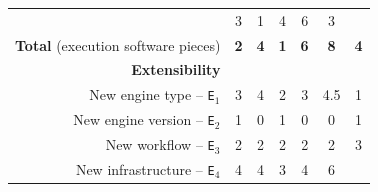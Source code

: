 \documentclass[preprint,3p,twocolumn]{elsarticle}
\begin{document}
\begin{table}
\begin{tabular}{rcccccc}
                                     & \cellcolor[HTML]{99D699}3
                                     & \cellcolor[HTML]{99FF99}1
                                     & \cellcolor[HTML]{99C199}4
                                     & \cellcolor[HTML]{999999}6
                                     & \cellcolor[HTML]{99D699}3\\
  \textbf{Total} (execution software pieces)& \cellcolor[HTML]{99F099}\textbf{2}
                                     & \cellcolor[HTML]{99D399}\textbf{4}
                                     & \cellcolor[HTML]{99FF99}\textbf{1}
                                     & \cellcolor[HTML]{99B699}\textbf{6}
                                     & \cellcolor[HTML]{999999}\textbf{8}
                                     & \cellcolor[HTML]{99D399}\textbf{4}\\
\cellcolor[HTML]{EEEEEE}\textbf{Extensibility}& \multicolumn{6}{l}{\cellcolor[HTML]{EEEEEE}}\\
  New engine type -- \texttt{E$_1$}  & \cellcolor[HTML]{99C499}3
                                     & \cellcolor[HTML]{99A799}4
                                     & \cellcolor[HTML]{99E199}2
                                     & \cellcolor[HTML]{99C499}3
                                     & \cellcolor[HTML]{999999}4.5
                                     & \cellcolor[HTML]{99FF99}1\\
New engine version -- \texttt{E$_2$} & \cellcolor[HTML]{999999}1
                                     & \cellcolor[HTML]{99FF99}0
                                     & \cellcolor[HTML]{999999}1
                                     & \cellcolor[HTML]{99FF99}0
                                     & \cellcolor[HTML]{99FF99}0
                                     & \cellcolor[HTML]{999999}1\\
  New workflow -- \texttt{E$_3$} & \cellcolor[HTML]{99FF99}2
                                     & \cellcolor[HTML]{99FF99}2
                                     & \cellcolor[HTML]{99FF99}2
                                     & \cellcolor[HTML]{99FF99}2
                                     & \cellcolor[HTML]{99FF99}2
                                     & \cellcolor[HTML]{999999}3\\
New infrastructure -- \texttt{E$_4$} & \cellcolor[HTML]{99DD99}4
                                     & \cellcolor[HTML]{99DD99}4
                                     & \cellcolor[HTML]{99FF99}3
                                     & \cellcolor[HTML]{99DD99}4
                                     & \cellcolor[HTML]{999999}6

\end{tabular}
\end{table}
\end{document}
